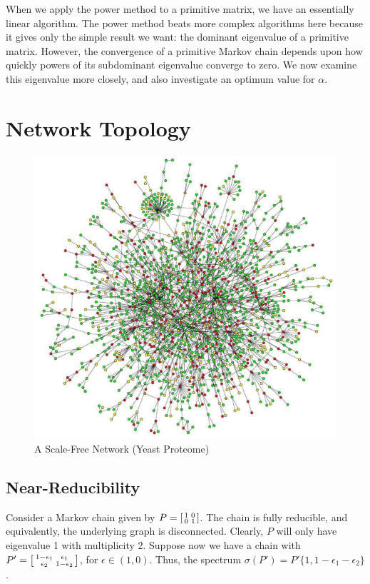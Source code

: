 \documentclass[12pt]{article}
\begin{document}
When we apply the power method to a primitive matrix, we have an
essentially linear algorithm. The power method beats more complex algorithms
here because it gives only the simple result we want: the dominant eigenvalue of
a primitive matrix. However, the convergence of a primitive Markov chain depends
upon how quickly powers of its subdominant eigenvalue converge to zero. We now
examine this eigenvalue more closely, and also investigate an optimum value for
$\alpha$.



\section{Network Topology}
\begin{figure}
  \centering
  \includegraphics[scale=1.8]{scale-free-network}
  \caption{A Scale-Free Network (Yeast Proteome) \cite{wangKineticConformationalCharacterization}}
  \label{fig:scale-free}
\end{figure}


\subsection{Near-Reducibility}
Consider a Markov chain given by
$P=\begin{bsmallmatrix} 1 & 0 \\ 0 & 1 \end{bsmallmatrix}$. The chain is fully
reducible, and equivalently, the underlying graph is disconnected. Clearly, $P$
will only have eigenvalue 1 with multiplicity 2. Suppose now we have a chain
with
$P'=\begin{bsmallmatrix} 1 - \epsilon_1 & \epsilon_1 \\ \epsilon_2 & 1 -
  \epsilon_2 \end{bsmallmatrix}$, for $\epsilon \in (1,0)$. Thus, the spectrum
$\sigma(P') =P' \{ 1, 1-\epsilon_1 - \epsilon_2 \}$.
\end{document}
